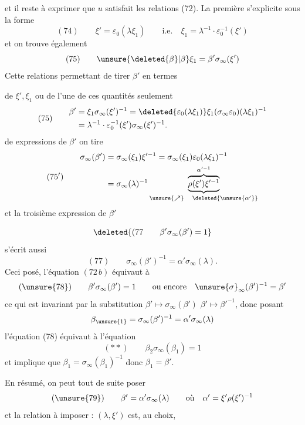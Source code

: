 et il reste à exprimer que $u$ satisfait les relations (72). La première s'explicite sous la forme
\[
(74)\qquad\xi'=\varepsilon_0(\lambda\xi_1)\qquad\text{i.e.}\quad\xi_1=\lambda^{-1}\cdot\varepsilon_0^{-1}(\xi')
\]
et on trouve également
\[
(75)\qquad\unsure{\deleted{\beta}|\beta}\xi_1=\beta'\sigma_\infty(\xi')
\]
Cette relations permettant de tirer $\beta'$ en termes

de $\xi',\xi_1$ ou de l'une de ces quantités seulement
\[
(75)\qquad\begin{aligned}
\beta'&=\xi_1\sigma_\infty(\xi')^{-1}=\deleted{\varepsilon_0(\lambda\xi_1)}\xi_1(\sigma_\infty\varepsilon_0)(\lambda\xi_1)^{-1}\\
&=\lambda^{-1}\cdot\varepsilon_0^{-1}(\xi')\sigma_\infty(\xi')^{-1}.
\end{aligned}
\]
de   expressions de $\beta'$ on tire
\[
(75')\qquad\begin{aligned}
\sigma_\infty(\beta')&=\sigma_\infty(\xi_1)\xi'^{-1}=\sigma_\infty(\xi_1)\varepsilon_0(\lambda\xi_1)^{-1}\\
&=\sigma_\infty(\lambda)^{-1}\underbrace{\overbrace{\rho(\xi')\xi'^{-1}}^{\alpha'^{-1}}}_{\unsure{\nearrow}\quad\deleted{\unsure{\alpha'}}}
\end{aligned}
\]
et la troisième expression de $\beta'$ 

\[
\deleted{(77\qquad\beta'\sigma_\infty(\beta')=1}
\]
s'écrit aussi
\[
(77)\qquad\sigma_\infty(\beta')^{-1}=\alpha'\sigma_\infty(\lambda).
\]
Ceci posé, l'équation $(72\,b)$ équivaut à
\[
(\unsure{78})\qquad\beta'\sigma_\infty(\beta')=1\qquad\text{ou encore}\quad\unsure{\sigma}_\infty(\beta')^{-1}=\beta'
\]
ce qui est invariant par la substitution $\beta'\mapsto\sigma_\infty(\beta')$  $\beta'\mapsto\beta'^{-1}$, donc posant
\[
\beta_{\unsure{1}}=\sigma_\infty(\beta')^{-1}=\alpha'\sigma_\infty(\lambda)
\]
l'équation (78) équivaut à l'équation
\[
(**)\qquad\beta_2\sigma_\infty(\beta_1)=1
\]
et implique que $\beta_1=\sigma_\infty(\beta_1)^{-1}$ donc $\beta_1=\beta'$.

En résumé, on peut tout de suite poser
\[
(\unsure{79})\qquad\beta'=\alpha'\sigma_\infty(\lambda)\qquad\text{où}\quad\alpha'=\xi'\rho(\xi')^{-1}
\]
et la relation à imposer : $(\lambda,\xi')$ est, au choix,


